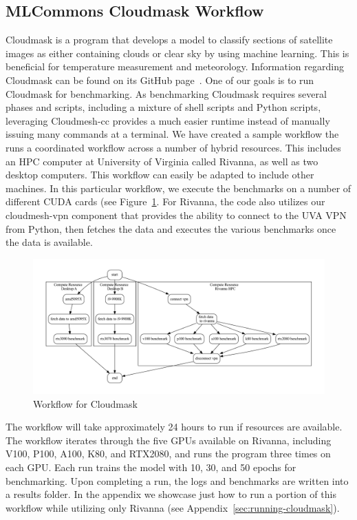 
\subsection{MLCommons Cloudmask Workflow}
\label{cloudmask-workflow}

Cloudmask is a program that develops a model to classify sections of
satellite images as either containing clouds or clear sky by using
machine learning. This is beneficial for temperature measurement and
meteorology.  Information regarding Cloudmask can be found on its
GitHub page~\cite{www-cloudmask}.  One of our goals is to run
Cloudmask for benchmarking.  As benchmarking Cloudmask requires
several phases and scripts, including a mixture of shell scripts and
Python scripts, leveraging Cloudmesh-cc provides a much easier runtime
instead of manually issuing many commands at a terminal.  We have
created a sample workflow the runs a coordinated workflow across a
number of hybrid resources. This includes an HPC computer at
University of Virginia called Rivanna, as well as two desktop
computers. This workflow can easily be adapted to include other machines. In this
particular workflow, we execute the benchmarks on a number of
different CUDA cards (see Figure~\ref{fig:cloudmaskwf}. For Rivanna,
the code also utilizes our cloudmesh-vpn component that provides the
ability to connect to the UVA VPN from Python, then fetches the data
and executes the various benchmarks once the data is available.

\begin{figure}[htb]
\centering
\includegraphics[width=1.0\columnwidth]{images/cloudmask-wf.pdf}
\vspace{-1cm}
\caption{Workflow for Cloudmask}\label{fig:cloudmaskwf}
\end{figure}

The workflow will take approximately 24 hours to run if resources are
available. The workflow iterates through the five GPUs available on
Rivanna, including V100, P100, A100, K80, and RTX2080, and runs the program
three times on each GPU. Each run trains the model with 10, 30, and 50
epochs for benchmarking. Upon completing a run, the logs and
benchmarks are written into a results folder.
In the appendix we showcase just how to run a portion of this workflow
while utilizing only Rivanna (see Appendix~\ref{sec:running-cloudmask}).


